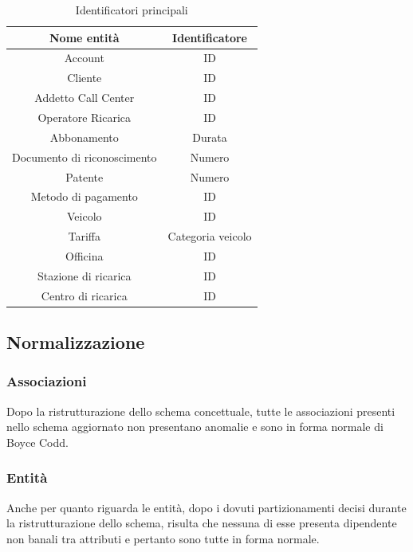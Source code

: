 \documentclass{article}
\begin{document}
\begin{table}[H]
    \centering
    \begin{tabular}{|c|c|}
    \hline
        \textbf{Nome entità} & \textbf{Identificatore} \\ \hline
        Account & ID \\
        Cliente & ID \\
        Addetto Call Center & ID \\
        Operatore Ricarica & ID \\
        Abbonamento & Durata \\
        Documento di riconoscimento & Numero \\
        Patente & Numero \\
        Metodo di pagamento & ID \\
        Veicolo & ID \\
        Tariffa & Categoria veicolo \\
        Officina & ID \\
        Stazione di ricarica & ID \\
        Centro di ricarica & ID \\ 
        \hline
    \end{tabular}
    \caption{Identificatori principali}
    \label{tab:identificatori-principali}
\end{table}

\subsection{Normalizzazione}

\subsubsection{Associazioni}

Dopo la ristrutturazione dello schema concettuale, tutte le associazioni presenti nello schema aggiornato non presentano anomalie e sono in forma normale di Boyce Codd. 

\subsubsection{Entità}

Anche per quanto riguarda le entità, dopo i dovuti partizionamenti decisi durante la ristrutturazione dello schema, risulta che nessuna di esse presenta dipendente non banali tra attributi e pertanto sono tutte in forma normale.
\end{document}
